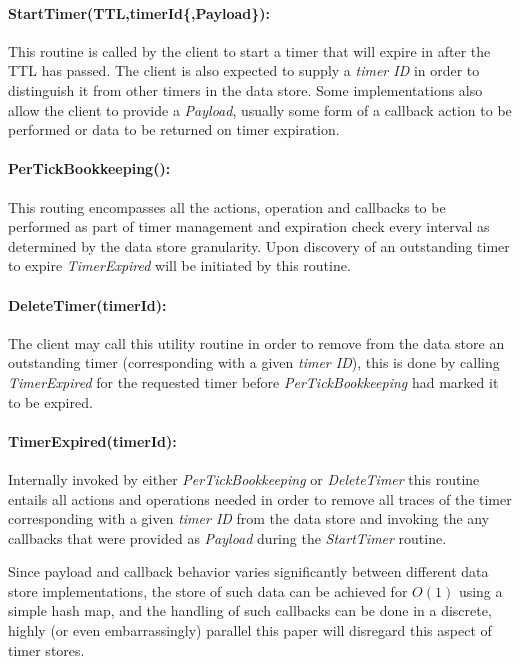 \documentclass[twocolumn,a4paper]{article}
\begin{document}
\paragraph{StartTimer(TTL,timerId\{,Payload\}):} This routine is called by the client to start a timer that will expire in after the TTL has passed. The client is also expected to supply a \textit{timer ID} in order to distinguish it from other timers in the data store. Some implementations also allow the client to provide a \textit{Payload}, usually some form of a callback action to be performed or data to be returned on timer expiration.

\paragraph{PerTickBookkeeping():} This routing encompasses all the actions, operation and callbacks to be performed as part of timer management and  expiration check every interval as determined by the data store granularity. Upon discovery of an outstanding timer to expire \textit{TimerExpired} will be initiated by this routine.

\paragraph{DeleteTimer(timerId):} The client may call this utility routine in order to remove from the data store an outstanding timer (corresponding with a given \textit{timer ID}), this is done by calling \textit{TimerExpired} for the requested timer before \textit{PerTickBookkeeping} had marked it to be expired.

\paragraph{TimerExpired(timerId):} Internally invoked by either \textit{PerTickBookkeeping} or \textit{DeleteTimer} this routine entails all actions and operations needed in order to remove all traces of the timer corresponding with a given \textit{timer ID} from the data store and invoking the any callbacks that were provided as \textit{Payload} during the \textit{StartTimer} routine.

\vspace{5mm}

Since payload and callback behavior varies significantly between different data store implementations, the store of such data can be achieved for $ O(1) $ using a simple hash map, and the handling of such callbacks can be done in a discrete, highly (or even embarrassingly) parallel this paper will disregard this aspect of timer stores.
\end{document}
